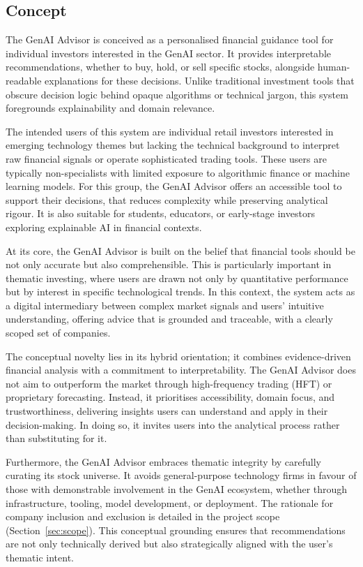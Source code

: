 \subsection{Concept}

The GenAI Advisor is conceived as a personalised financial guidance tool for individual investors interested in the GenAI sector. It provides interpretable recommendations, whether to buy, hold, or sell specific stocks, alongside human-readable explanations for these decisions. Unlike traditional investment tools that obscure decision logic behind opaque algorithms or technical jargon, this system foregrounds explainability and domain relevance.

The intended users of this system are individual retail investors interested in emerging technology themes but lacking the technical background to interpret raw financial signals or operate sophisticated trading tools. These users are typically non-specialists with limited exposure to algorithmic finance or machine learning models. For this group, the GenAI Advisor offers an accessible tool to support their decisions, that reduces complexity while preserving analytical rigour. It is also suitable for students, educators, or early-stage investors exploring explainable AI in financial contexts.

At its core, the GenAI Advisor is built on the belief that financial tools should be not only accurate but also comprehensible. This is particularly important in thematic investing, where users are drawn not only by quantitative performance but by interest in specific technological trends. In this context, the system acts as a digital intermediary between complex market signals and users' intuitive understanding, offering advice that is grounded and traceable, with a clearly scoped set of companies.

The conceptual novelty lies in its hybrid orientation; it combines evidence-driven financial analysis with a commitment to interpretability. The GenAI Advisor does not aim to outperform the market through high-frequency trading (HFT) or proprietary forecasting. Instead, it prioritises accessibility, domain focus, and trustworthiness, delivering insights users can understand and apply in their decision-making. In doing so, it invites users into the analytical process rather than substituting for it.

Furthermore, the GenAI Advisor embraces thematic integrity by carefully curating its stock universe. It avoids general-purpose technology firms in favour of those with demonstrable involvement in the GenAI ecosystem, whether through infrastructure, tooling, model development, or deployment. The rationale for company inclusion and exclusion is detailed in the project scope (Section~\ref{sec:scope}). This conceptual grounding ensures that recommendations are not only technically derived but also strategically aligned with the user's thematic intent.

